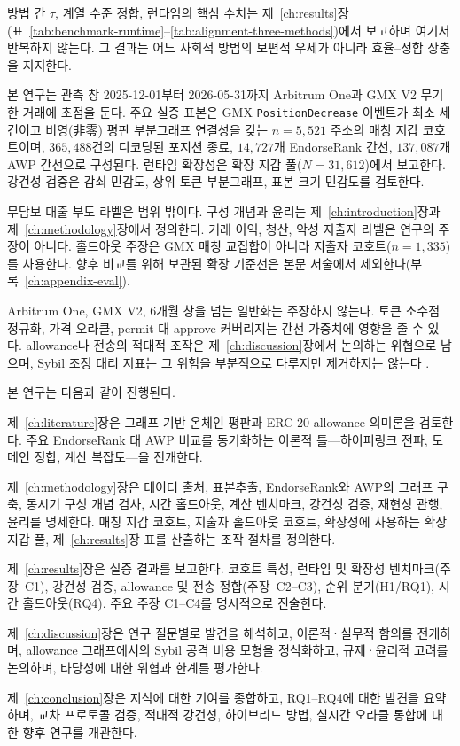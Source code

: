 방법 간 $\tau$, 계열 수준 정합, 런타임의 핵심 수치는 제~\ref{ch:results}장(표~\ref{tab:benchmark-runtime}--\ref{tab:alignment-three-methods})에서 보고하며 여기서 반복하지 않는다. 그 결과는 어느 사회적 방법의 보편적 우세가 아니라 효율--정합 상충을 지지한다.


본 연구는 관측 창 2025-12-01부터 2026-05-31까지 Arbitrum One과 GMX V2 무기한 거래에 초점을 둔다. 주요 실증 표본은 GMX \texttt{PositionDecrease} 이벤트가 최소 세 건이고 비영(非零) 평판 부분그래프 연결성을 갖는 $n=5{,}521$ 주소의 매칭 지갑 코호트이며, $365{,}488$건의 디코딩된 포지션 종료, $14{,}727$개 EndorseRank 간선, $137{,}087$개 AWP 간선으로 구성된다. 런타임 확장성은 확장 지갑 풀($N=31{,}612$)에서 보고한다. 강건성 검증은 감쇠 민감도, 상위 토큰 부분그래프, 표본 크기 민감도를 검토한다.

무담보 대출 부도 라벨은 범위 밖이다. 구성 개념과 윤리는 제~\ref{ch:introduction}장과 제~\ref{ch:methodology}장에서 정의한다. 거래 이익, 청산, 악성 지출자 라벨은 연구의 주장이 아니다. 홀드아웃 주장은 GMX 매칭 교집합이 아니라 지출자 코호트($n=1{,}335$)를 사용한다. 향후 비교를 위해 보관된 확장 기준선은 본문 서술에서 제외한다(부록~\ref{ch:appendix-eval}).

Arbitrum One, GMX V2, 6개월 창을 넘는 일반화는 주장하지 않는다. 토큰 소수점 정규화, 가격 오라클, permit 대 approve 커버리지는 간선 가중치에 영향을 줄 수 있다. allowance나 전송의 적대적 조작은 제~\ref{ch:discussion}장에서 논의하는 위협으로 남으며, Sybil 조정 대리 지표는 그 위험을 부분적으로 다루지만 제거하지는 않는다 .


본 연구는 다음과 같이 진행된다.

제~\ref{ch:literature}장은 그래프 기반 온체인 평판과 ERC-20 allowance 의미론을 검토한다. 주요 EndorseRank 대 AWP 비교를 동기화하는 이론적 틀---하이퍼링크 전파, 도메인 정합, 계산 복잡도---을 전개한다.

제~\ref{ch:methodology}장은 데이터 출처, 표본추출, EndorseRank와 AWP의 그래프 구축, 동시기 구성 개념 검사, 시간 홀드아웃, 계산 벤치마크, 강건성 검증, 재현성 관행, 윤리를 명세한다. 매칭 지갑 코호트, 지출자 홀드아웃 코호트, 확장성에 사용하는 확장 지갑 풀, 제~\ref{ch:results}장 표를 산출하는 조작 절차를 정의한다.

제~\ref{ch:results}장은 실증 결과를 보고한다. 코호트 특성, 런타임 및 확장성 벤치마크(주장~C1), 강건성 검증, allowance 및 전송 정합(주장~C2--C3), 순위 분기(H1/RQ1), 시간 홀드아웃(RQ4). 주요 주장 C1--C4를 명시적으로 진술한다.

제~\ref{ch:discussion}장은 연구 질문별로 발견을 해석하고, 이론적·실무적 함의를 전개하며, allowance 그래프에서의 Sybil 공격 비용 모형을 정식화하고, 규제·윤리적 고려를 논의하며, 타당성에 대한 위협과 한계를 평가한다.

제~\ref{ch:conclusion}장은 지식에 대한 기여를 종합하고, RQ1--RQ4에 대한 발견을 요약하며, 교차 프로토콜 검증, 적대적 강건성, 하이브리드 방법, 실시간 오라클 통합에 대한 향후 연구를 개관한다.
